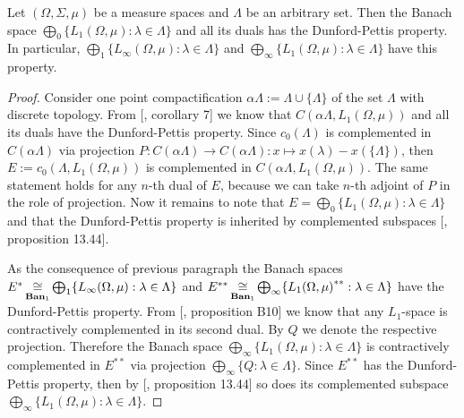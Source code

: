 \begin{proposition}\label{C0SumOfL1SpHaveDPP} Let $(\Omega, \Sigma, \mu)$ be a
measure spaces and $\Lambda$ be an arbitrary set. Then the Banach space
$\bigoplus_0 \{L_1(\Omega,\mu):\lambda\in\Lambda \}$ and all its duals has the
Dunford-Pettis property. In particular, $\bigoplus_1
\{L_\infty(\Omega,\mu):\lambda\in\Lambda \}$ and $\bigoplus_\infty
\{L_1(\Omega,\mu):\lambda\in\Lambda \}$ have this property.
\end{proposition}
\begin{proof} Consider one point compactification $\alpha\Lambda:=\Lambda\cup
\{\Lambda \}$ of the set $\Lambda$ with discrete topology. From
[\cite{BourgOnTheDPP}, corollary 7] we know 
that $C(\alpha\Lambda, L_1(\Omega, \mu))$ and all its duals have 
the Dunford-Pettis property. Since $c_0(\Lambda)$ is complemented 
in $C(\alpha\Lambda)$ via projection 
$P:C(\alpha\Lambda)\to C(\alpha\Lambda):x\mapsto x(\lambda)-x( \{\Lambda \})$, 
then $E:=c_0(\Lambda, L_1(\Omega,\mu))$ is complemented 
in $C(\alpha\Lambda, L_1(\Omega, \mu))$. The same statement holds for 
any $n$-th dual of $E$, because we can take $n$-th
adjoint of $P$ in the role of projection. Now it remains to note that
$E=\bigoplus_0 \{L_1(\Omega,\mu):\lambda\in\Lambda \}$ and that the
Dunford-Pettis property is inherited by complemented subspaces
[\cite{FabHabBanSpTh}, proposition 13.44]. 

As the consequence of previous paragraph the Banach spaces
$E^*
\mathop{\mathbin{\cong}}\limits_{\mathbf{Ban}_1}
\bigoplus_1 \{
    L_\infty(\Omega,\mu):\lambda\in\Lambda
 \}$ 
and $E^{**}
\mathop{\mathbin{\cong}}\limits_{\mathbf{Ban}_1}
    \bigoplus_\infty \{{L_1(\Omega,\mu)}^{**}:\lambda\in\Lambda
 \}$ 
have the Dunford-Pettis property.
From [\cite{DefFloTensNorOpId}, proposition B10] we know that any $L_1$-space is
contractively complemented in its second dual. By $Q$ we denote the respective
projection. Therefore the Banach space $\bigoplus_\infty
\{L_1(\Omega,\mu):\lambda\in\Lambda \}$ is contractively complemented in
$E^{**}$ via projection $\bigoplus_\infty  \{Q:\lambda\in\Lambda \}$. Since
$E^{**}$ has the Dunford-Pettis property, then by [\cite{FabHabBanSpTh},
proposition 13.44] so does its complemented 
subspace $\bigoplus_\infty \{L_1(\Omega,\mu):\lambda\in\Lambda \}$.
\end{proof}

